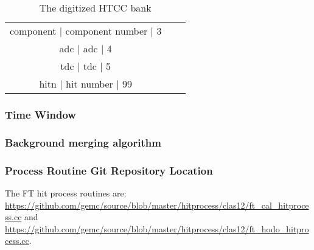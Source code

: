 \begin{table}[h]
\begin{center}
\begin{tabular}{| c | c | c |}
				   component  |                                  component number  |    3   \\
						 adc  |                                               adc  |    4   \\
						 tdc  |                                               tdc  |    5   \\
						hitn  |                                        hit number  |   99   \\
			\hline \hline
		\end{tabular}
	\end{center}
	\caption{The digitized HTCC bank}\label{tab:ftBank}
\end{table}

\subsubsection{Time Window}

\subsubsection{Background merging algorithm}

\subsubsection{Process Routine Git Repository Location}
The FT hit process routines are: \url{https://github.com/gemc/source/blob/master/hitprocess/clas12/ft_cal_hitprocess.cc} and
\url{https://github.com/gemc/source/blob/master/hitprocess/clas12/ft_hodo_hitprocess.cc}.
